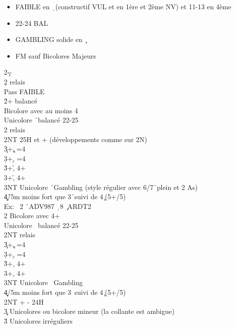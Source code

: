 \documentclass[a4paper]{article}
\begin{document}
\begin{itemize}
\item FAIBLE en \d\ (constructif VUL et en 1ère et 2ème NV) et 11-13 en 4ème

\item 22-24 BAL

\item GAMBLING solide en \c\ 

\item FM sauf Bicolores Majeurs

\end{itemize}

\begin{bidtable}
2\c--\+\\
2\d \> relais\+\\
Pass \> FAIBLE \d \\
2\h {}+ balancé\\
\>Bicolore avec au moins 4\h \\
\>Unicolore \h\ balancé 22-25\+\\
2\s \> relais\+\\
2NT \> 25H et + (développements comme sur 2N)\\
3\c {}+\c , =4\h \\
3\d {}+\d , =4\h \\
3\h {}+\h , 4+\c \\
3\s {}+\h , 4+\d \\
3NT \> Unicolore \h\ Gambling (style régulier avec 6/7\h\ plein et 2 As)\\
4\c\d {}\h /5m moins fort que 3\h\ suivi de 4\c\ (5+/5)\\
\>Ex: \s\ 2 \h\ ADV987 \d\ 8 \c\ ARDT2\-\-\\
2\s \> Bicolore avec 4+\s \\
\>Unicolore \s\ balancé 22-25\+\\
2NT \> relais\+\\
3\c {}+\c , =4\s \\
3\d {}+\d , =4\s \\
3\h {}+\s , 4+\c \\
3\s {}+\s , 4+\d \\
3NT \> Unicolore \s\ Gambling\\
4\c\d {}\s /5m moins fort que 3\s\ suivi de 4\c\ (5+/5)\-\-\\
2NT + - 24H\\
3\c\d \> Unicolores ou bicolore mineur (la collante est ambigue)\\
3\h\s \> Unicolores irréguliers\\

\end{bidtable}
\end{document}
